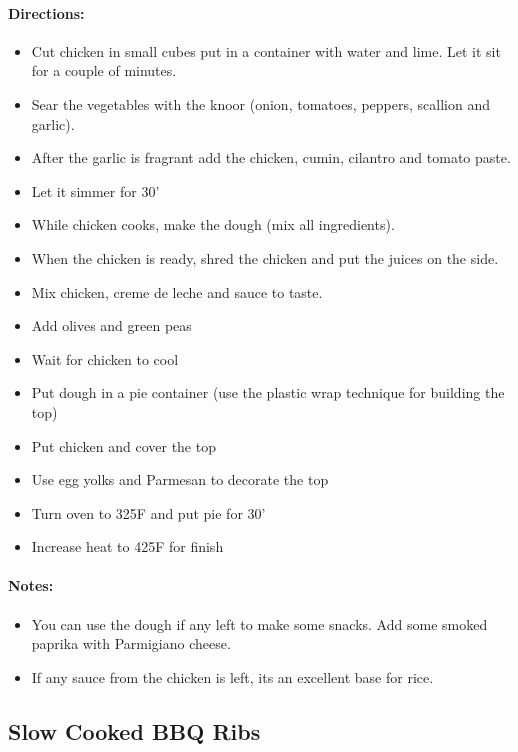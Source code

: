 \documentclass{article}
\begin{document}
\paragraph{Directions:}
\begin{itemize}
	\item Cut chicken in small cubes put in a container with water and lime. Let it sit for a couple of minutes.
	\item Sear the vegetables with the knoor (onion, tomatoes, peppers, scallion and garlic).
	\item After the garlic is fragrant add the chicken, cumin, cilantro and tomato paste. 
	\item Let it simmer for 30'
	\item While chicken cooks, make the dough (mix all ingredients).
	\item When the chicken is ready, shred the chicken and put the juices on the side.
	\item Mix chicken, creme de leche and sauce to taste. 
	\item Add olives and green peas
	\item Wait for chicken to cool
	\item Put dough in a pie container (use the plastic wrap technique for building the top)
	\item Put chicken and cover the top
	\item Use egg yolks and Parmesan to decorate the top
	\item Turn oven to 325F and put pie for 30'
	\item Increase heat to 425F for finish
\end{itemize}

\paragraph{Notes:}

\begin{itemize}
\item You can use the dough if any left to make some snacks. Add some smoked paprika with Parmigiano cheese.
\item If any sauce from the chicken is left, its an excellent base for rice.
\end{itemize}

\subsection{Slow Cooked BBQ Ribs}
\end{document}
